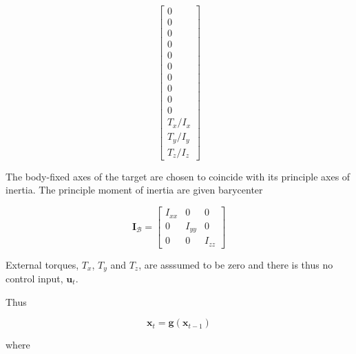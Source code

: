 \begin{equation}
\begin{bmatrix}
        0 \\
        0 \\
        0 \\
        0 \\
        0 \\
        0 \\
        0 \\
        0 \\
        0 \\
        0 \\
        \mathit{T}_x/\mathit{I}_x \\
        \mathit{T}_y/\mathit{I}_y \\
        \mathit{T}_z/\mathit{I}_z
    \end{bmatrix}
\end{equation}

The body-fixed axes of the target are chosen to coincide with its principle axes of inertia. The principle moment of inertia are given barycenter

\begin{equation}
    \mathbf{I}_\mathcal{B} = 
    \begin{bmatrix}
        \mathit{I}_{xx} & 0 & 0 \\
        0 & \mathit{I}_{yy} & 0 \\
        0 & 0 & \mathit{I}_{zz}
    \end{bmatrix}
\end{equation}

External torques, $\mathit{T}_x$, $\mathit{T}_y$ and $\mathit{T}_z$, are asssumed to be zero and there is thus no control input, $\mathbf{u}_t$. 

Thus 

\begin{equation}
    \mathbf{x}_t = \mathbf{g}(\mathbf{x}_{t-1})
\end{equation}

where

